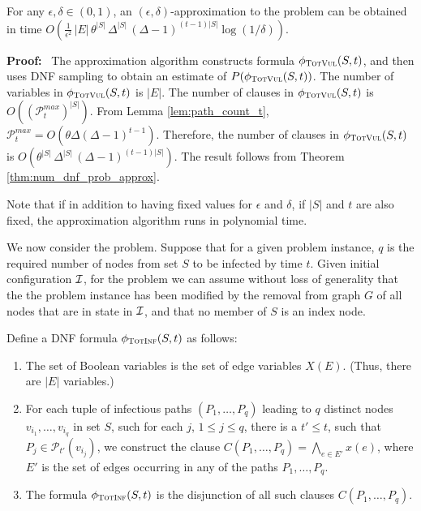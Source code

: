\begin{theorem}
\label{thm:totvul_approx}
For any $\epsilon, \delta\in(0,1)$, 
an $(\epsilon, \delta)$-approximation to the \tTotVuls{} problem
can be obtained in time 
$O(\frac{1}{\epsilon^2}\,|E|\,\theta^{|S|} \,\Delta^{|S|} \,(\Delta-1)^{(t-1)|S|}\log{(1/\delta)})$. 
\end{theorem}
\noindent
\textbf{Proof:}~
The approximation algorithm constructs formula $\phi_{\textsc{TotVul}}(S,t)$,
and then uses DNF sampling to obtain an estimate of $P(\phi_{\textsc{TotVul}}(S,t))$.
The number of variables in $\phi_{\textsc{TotVul}}(S,t)$ is $|E|$.
The number of clauses in $\phi_{\textsc{TotVul}}(S,t)$
is  $O( ( \mathcal{P}_t^{max} )^{|S|} )$.
From Lemma \ref{lem:path_count_t}, 
$\mathcal{P}_t^{max} = O(\theta \Delta (\Delta-1)^{t-1})$.
Therefore, the number of clauses in $\phi_{\textsc{TotVul}}(S,t)$
is  $O( \theta^{|S|} \,\Delta^{|S|} \,(\Delta-1)^{(t-1)|S|} )$.
The result follows from Theorem \ref{thm:num_dnf_prob_approx}. 
 \QED

Note that if in addition to having fixed values for $\epsilon$ and $\delta$, 
if $|S|$ and $t$ are also fixed,
the approximation algorithm runs in polynomial time.

We now consider the \tTotInfs{} problem.
Suppose that for a given problem instance, 
$q$ is the required number of nodes from set $S$ to be infected by time $t$. 
Given initial configuration $\mbox{${\cal I}$}{}$, 
for the  \tTotInfs{} problem
we can assume without loss of generality that the the problem instance  has been modified 
by the removal from graph $G$ of all nodes
that are in state \rstate{} in $\mbox{${\cal I}$}{}$,
and that no member of $S$ is an index node.

Define a DNF formula $\phi_{\textsc{TotInf}}(S,t)$ as follows:
\begin{enumerate}
\item
The set of Boolean variables is the set of edge variables $X(E)$.
(Thus, there are $|E|$ variables.)
\item
For each tuple of infectious paths $(P_1,\ldots,P_q)$ leading to $q$ distinct nodes 
$v_{i_1},  \ldots, v_{i_q}$
in set $S$, 
such for each $j$, $1 \leq j \leq q$,
there is  a $t' \leq t$,
such that $P_j \in \mathcal{P}_{t'}(v_{i_j})$,
we construct the clause $C(P_1,\ldots,P_q)=\bigwedge_{e\in E'} x(e)$, where
$E'$ is the set of edges occurring in any of the paths $P_1,\ldots,P_q$.
\item
The formula $\phi_{\textsc{TotInf}}(S,t)$ is the disjunction of all such clauses $C(P_1,\ldots,P_q)$.
\end{enumerate}

